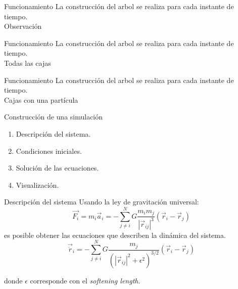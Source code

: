 \documentclass[handout]{beamer}
\begin{document}
\begin{frame}{Funcionamiento}
	La construcci\'on del arbol se realiza para cada instante de tiempo.
	\centering
	\\
	Observaci\'on
\end{frame}
\begin{frame}{Funcionamiento}
	La construcci\'on del arbol se realiza para cada instante de tiempo.
	\centering
	\\
	Todas las cajas
\end{frame}
\begin{frame}{Funcionamiento}
	La construcci\'on del arbol se realiza para cada instante de tiempo.
	\centering
	\\
	Cajas con una part\'icula
\end{frame}
\begin{frame}{Construcci\'on de una simulaci\'on}
	\begin{enumerate}
		\item Descripci\'on del sistema. \pause
		\item Condiciones iniciales. \pause
		\item Soluci\'on de las ecuaciones. \pause
		\item Visualizaci\'on.
	\end{enumerate}
\end{frame}
\begin{frame}{Descripci\'on del sistema}
	Usando la ley de gravitaci\'on universal:
	\begin{equation}
		\vec{F_i} = m_i\vec{a}_i = - \sum\limits_{j\neq i}^N G\dfrac{m_im_j}{|\vec{r}_{ij}|^3}\left(\vec{r}_i - \vec{r}_j\right)
	\end{equation}\pause
	es posible obtener las ecuaciones que describen la din\'amica del sistema.\pause
	\begin{equation}
		\vec{\ddot{r}}_i = - \sum\limits_{j\neq i}^N G\dfrac{m_j}{\left(|\vec{r}_{ij}|^2 + \epsilon^2\right)^{3/2}}\left(\vec{r}_i - \vec{r}_j\right)
	\end{equation}
	
	donde $\epsilon$ corresponde con el \textit{softening length}.
\end{frame}
\end{document}
